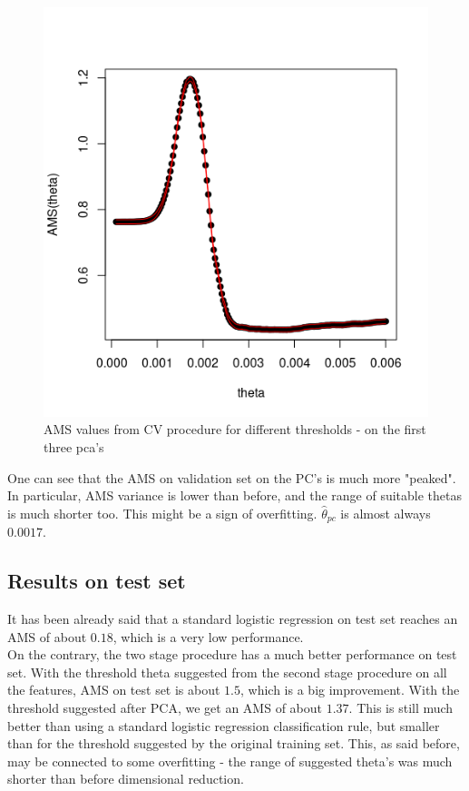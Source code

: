 \documentclass[]{article}
\begin{document}
\begin{figure}[H]
\centering
\includegraphics[scale=0.6]{../Pictures/trainpcatunedtheta.png}
\caption{AMS values from CV procedure for different thresholds - on the first three pca's}
\label{fig: tuned_pca}
\end{figure}

One can see that the AMS on validation set on the PC's is much more "peaked". In particular, AMS variance is lower than before, and the range of suitable thetas is much shorter too. This might be a sign of overfitting. $\hat{\theta}_{pc}$ is almost always $0.0017$.

\subsection{Results on test set}

It has been already said that a standard logistic regression on test set reaches an AMS of about $0.18$, which is a very low performance. \\

On the contrary, the two stage procedure has a much better performance on test set. With the threshold theta suggested from the second stage procedure on all the features, AMS on test set is about $1.5$, which is a big improvement. With the threshold suggested after PCA, we get an AMS of about $1.37$. This is still much better than using a standard logistic regression classification rule, but smaller than for the threshold suggested by the original training set. This, as said before, may be connected to some overfitting - the range of suggested theta's was much shorter than before dimensional reduction.\\
\end{document}
